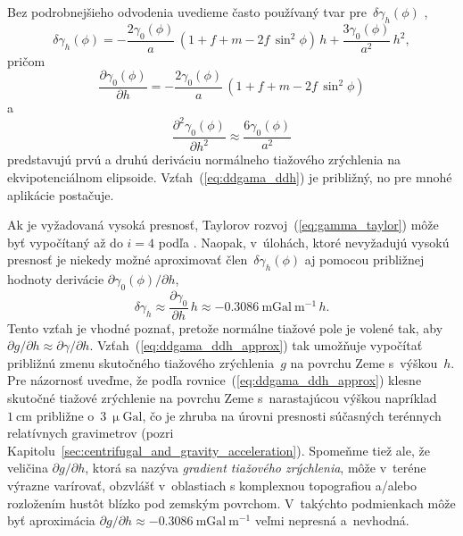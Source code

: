 \documentclass[a4paper,12pt]{book}
\begin{document}
Bez podrobnejšieho odvodenia uvedieme často používaný tvar 
pre~$\delta\gamma_h(\phi)$ \parencite[pozri 
napríklad][]{MoritzPhysicalGeodesy},
%
\begin{equation}
\delta\gamma_h(\phi) = -\frac{2\gamma_0(\phi)}{a} \, (1 + f + m - 2f \, 
\sin^2\phi) \, h + \frac{3\gamma_0(\phi)}{a^2} \, h^2{,}
\end{equation}
%
pričom
%
\begin{equation}
\frac{\partial \gamma_0(\phi)}{\partial h} = -\frac{2\gamma_0(\phi)}{a} \, (1 
+ f + m - 2f \, \sin^2\phi)
\end{equation}
%
a
%
\begin{equation}
\label{eq:ddgama_ddh}
\frac{\partial^2 \gamma_0(\phi)}{\partial h^2} \approx 
\frac{6\gamma_0(\phi)}{a^2}
\end{equation}
%
predstavujú prvú a druhú deriváciu normálneho tiažového zrýchlenia na 
ekvipotenciálnom elipsoide.  Vzťah~(\ref{eq:ddgama_ddh}) je približný, no pre 
mnohé aplikácie postačuje.

Ak je vyžadovaná vysoká presnosť, Taylorov rozvoj~(\ref{eq:gamma_taylor}) môže 
byť vypočítaný až do $i = 4$ podľa \textcite{Pick2000}.  Naopak, v~úlohách, 
ktoré nevyžadujú vysokú presnosť je niekedy možné aproximovať 
člen~$\delta\gamma_h(\phi)$ aj pomocou približnej hodnoty derivácie $\partial 
\gamma_0(\phi) \slash \partial h$,
%
\begin{equation}
\label{eq:ddgama_ddh_approx}
\delta\gamma_h \approx \frac{\partial \gamma_0}{\partial h} \, h \approx 
-0.3086 \ \mathrm{mGal} \ \mathrm{m}^{-1} \, h{.}
\end{equation}
%
Tento vzťah je vhodné poznať, pretože normálne tiažové pole je volené tak, aby 
$\partial g \slash \partial h \approx \partial \gamma \slash \partial h$.  
Vzťah~(\ref{eq:ddgama_ddh_approx}) tak umožňuje vypočítať približnú zmenu 
skutočného tiažového zrýchlenia~$g$ na povrchu Zeme s~výškou~$h$.  Pre 
názornosť uveďme, že podľa rovnice~(\ref{eq:ddgama_ddh_approx}) klesne skutočné 
tiažové zrýchlenie na povrchu Zeme s~narastajúcou výškou napríklad~$1 
\ \mathrm{cm}$ približne o~$3 \ \upmu\mathrm{Gal}$, čo je zhruba na úrovni 
presnosti súčasných terénnych relatívnych gravimetrov (pozri 
Kapitolu~\ref{sec:centrifugal_and_gravity_acceleration}).  Spomeňme tiež ale, 
že veličina $\partial g \slash \partial h$, ktorá sa nazýva \emph{gradient 
tiažového zrýchlenia}, môže v~teréne výrazne varírovať, obzvlášť v~oblastiach 
s komplexnou topografiou a/alebo rozložením hustôt blízko pod zemským povrchom.  
V~takýchto podmienkach môže byť aproximácia $\partial g \slash \partial 
h \approx -0.3086 \ \mathrm{mGal} \ \mathrm{m}^{-1}$ veľmi nepresná a~nevhodná.
\end{document}
